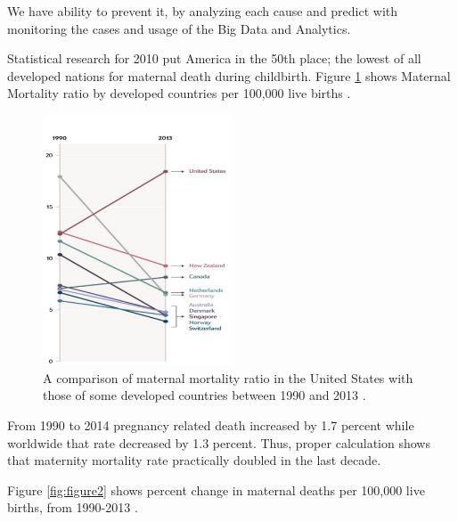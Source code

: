 \documentclass[sigconf]{acmart}
\begin{document}
We have ability to prevent it, by analyzing each cause and predict with monitoring the cases and usage of the Big Data and Analytics. 

Statistical research for 2010 put America in the 50th place; the lowest of all developed nations for maternal death during childbirth\cite{bingham2011maternal}. Figure \ref{fig:figure1} shows Maternal Mortality ratio by developed countries per 100,000 live births \cite{maron2015has}.

\begin{figure}
  \centering
  \includegraphics[width=0.5\textwidth]{images/figure1.pdf}
  \caption{A comparison of maternal mortality ratio in the United States with those of some developed countries between 1990 and 2013 \cite{maron2015has}.} \label{fig:figure1} 
\end{figure}

From 1990 to 2014 pregnancy related death increased by 1.7 percent while worldwide that rate decreased by 1.3 percent. Thus, proper calculation shows that maternity mortality rate practically doubled in the last decade.

Figure \ref{fig:figure2} shows percent change in maternal deaths per 100,000 live births, from 1990-2013 \cite{kassebaum2016global}.
\end{document}
